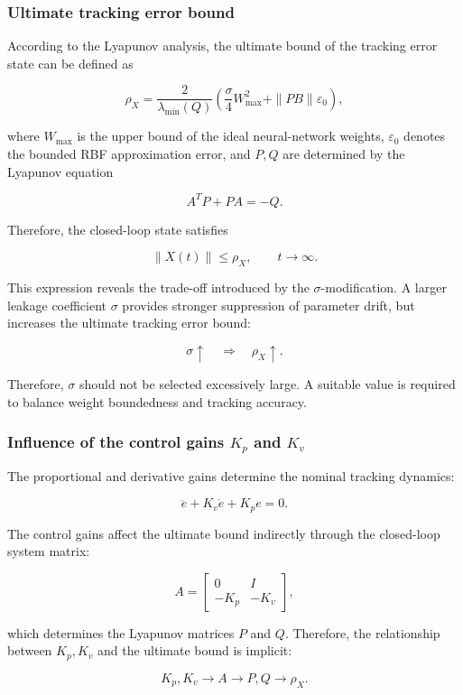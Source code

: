 \subsubsection{Ultimate tracking error bound}

According to the Lyapunov analysis, the ultimate bound of the tracking error state can be defined as

\[
\rho_X
=
\frac{2}{\lambda_{\min}(Q)}
\left(
\frac{\sigma}{4}W_{\max}^{2}
+
\|PB\|\varepsilon_0
\right),
\]

where $W_{\max}$ is the upper bound of the ideal neural-network weights, $\varepsilon_0$ denotes the bounded RBF approximation error, and $P,Q$ are determined by the Lyapunov equation

\[
A^{T}P+PA=-Q .
\]

Therefore, the closed-loop state satisfies

\[
\|X(t)\|\leq\rho_X,
\qquad t\rightarrow\infty .
\]


This expression reveals the trade-off introduced by the $\sigma$-modification. A larger leakage coefficient $\sigma$ provides stronger suppression of parameter drift, but increases the ultimate tracking error bound:

\[
\sigma\uparrow
\quad\Rightarrow\quad
\rho_X\uparrow .
\]

Therefore, $\sigma$ should not be selected excessively large. A suitable value is required to balance weight boundedness and tracking accuracy.


\subsubsection{Influence of the control gains $K_p$ and $K_v$}

The proportional and derivative gains determine the nominal tracking dynamics:

\[
\ddot e+K_v\dot e+K_pe=0 .
\]

The control gains affect the ultimate bound indirectly through the closed-loop system matrix:

\[
A=
\begin{bmatrix}
	0&I\\
	-K_p&-K_v
\end{bmatrix},
\]

which determines the Lyapunov matrices $P$ and $Q$. Therefore, the relationship between $K_p,K_v$ and the ultimate bound is implicit:

\[
K_p,K_v
\rightarrow
A
\rightarrow
P,Q
\rightarrow
\rho_X .
\]

